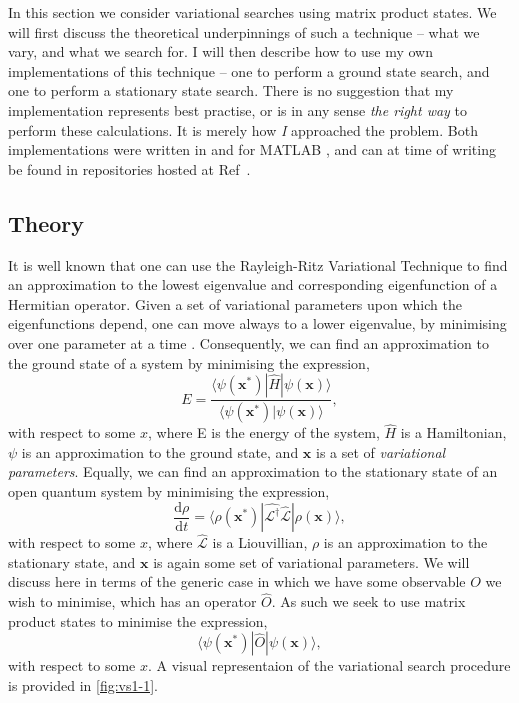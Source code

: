In this section we consider variational searches using matrix product states. We will first discuss the theoretical underpinnings of such a technique -- what we vary, and what we search for. I will then describe how to use my own implementations of this technique -- one to perform a ground state search, and one to perform a stationary state search. There is no suggestion that my implementation represents best practise, or is in any sense \emph{the right way} to perform these calculations. It is merely how \emph{I} approached the problem. Both implementations were written in and for MATLAB \cite{MATLAB}, and can at time of writing be found in repositories hosted at Ref~\cite{otb:githome}.
 
 \subsection{Theory}
It is well known that one can use the Rayleigh-Ritz Variational Technique to find an approximation to the lowest eigenvalue and corresponding eigenfunction of a Hermitian operator. Given a set of variational parameters upon which the eigenfunctions depend, one can move always to a lower eigenvalue, by minimising over one parameter at a time \cite{ArfWeb_RRVT, Gasiorowicz_RVT}. Consequently, we can find an approximation to the ground state of a system by minimising the expression,
\begin{equation}
E = \frac{\langle \psi (\mathbf{x}^{*}) | \hat{H} | \psi (\mathbf{x}) \rangle}{\langle \psi (\mathbf{x}^{*}) | \psi (\mathbf{x}) \rangle},
\label{eq:vs1-1}
\end{equation}
with respect to some \(x\), where E is the energy of the system, \(\hat{H}\) is a Hamiltonian, \(\psi\) is an approximation to the ground state, and \( \mathbf{x} \) is a set of \emph{variational parameters}. Equally, we can find an approximation to the stationary state of an open quantum system by minimising the expression,
\begin{equation}
\frac{\mathrm{d}\rho}{\mathrm{d}t} = \langle \rho(\mathbf{x}^{*}) | \hat{\mathcal{L}^{\dagger}} \hat{\mathcal{L}} | \rho(\mathbf{x}) \rangle,
\label{eq:vs1-2}
\end{equation}
with respect to some \(x\), where \(\hat{\mathcal{L}}\) is a Liouvillian, \(\rho\) is an approximation to the stationary state, and \(\mathbf{x}\) is again some set of variational parameters. We will discuss here in terms of the generic case in which we have some observable \(O\) we wish to minimise, which has an operator \(\hat{O}\). As such we seek to use matrix product states to minimise the expression,
\begin{equation}
\langle \psi(\mathbf{x}^{*}) | \hat{O} | \psi(\mathbf{x}) \rangle,
\label{eq:vs1-10}
\end{equation}
with respect to some \(x\). A visual representaion of the variational search procedure is provided in \cref{fig:vs1-1}.

